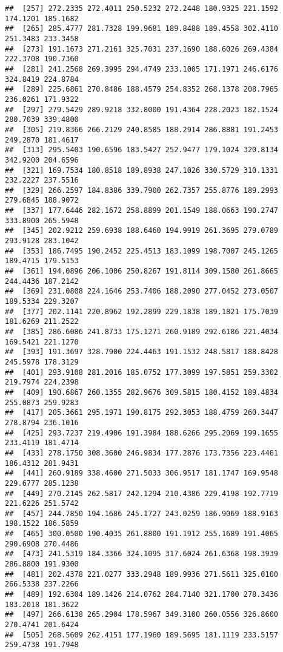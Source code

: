 \documentclass[
]{article}
\begin{document}
\begin{verbatim}
##  [257] 272.2335 272.4011 250.5232 272.2448 180.9325 221.1592 174.1201 185.1682
##  [265] 285.4777 281.7328 199.9681 189.8488 189.4558 302.4110 251.3483 233.3458
##  [273] 191.1673 271.2161 325.7031 237.1690 188.6026 269.4384 222.3708 190.7360
##  [281] 241.2568 269.3995 294.4749 233.1005 171.1971 246.6176 324.8419 224.8784
##  [289] 225.6861 270.8486 188.4579 254.8352 268.1378 208.7965 236.0261 171.9322
##  [297] 279.5429 289.9218 332.8000 191.4364 228.2023 182.1524 280.7039 339.4800
##  [305] 219.8366 266.2129 240.8585 188.2914 286.8881 191.2453 249.2870 181.4617
##  [313] 295.5403 190.6596 183.5427 252.9477 179.1024 320.8134 342.9200 204.6596
##  [321] 169.7534 180.8518 189.8938 247.1026 330.5729 310.1331 232.2227 237.5516
##  [329] 266.2597 184.8386 339.7900 262.7357 255.8776 189.2993 279.6845 188.9072
##  [337] 177.6446 282.1672 258.8899 201.1549 188.0663 190.2747 333.8900 265.5948
##  [345] 202.9212 259.6938 188.6460 194.9919 261.3695 279.0789 293.9128 283.1042
##  [353] 186.7495 190.2452 225.4513 183.1099 198.7007 245.1265 189.4715 179.5153
##  [361] 194.0896 206.1006 250.8267 191.8114 309.1580 261.8665 244.4436 187.2142
##  [369] 231.0808 224.1646 253.7406 188.2090 277.0452 273.0507 189.5334 229.3207
##  [377] 202.1141 220.8962 192.2899 229.1838 189.1821 175.7039 181.6269 211.2522
##  [385] 286.6086 241.8733 175.1271 260.9189 292.6186 221.4034 169.5421 221.1270
##  [393] 191.3697 328.7900 224.4463 191.1532 248.5817 188.8428 245.5978 178.3129
##  [401] 293.9108 281.2016 185.0752 177.3099 197.5851 259.3302 219.7974 224.2398
##  [409] 190.6867 260.1355 282.9676 309.5815 180.4152 189.4834 255.0873 259.9283
##  [417] 205.3661 295.1971 190.8175 292.3053 188.4759 260.3447 278.8794 236.1016
##  [425] 293.7237 219.4906 191.3984 188.6266 295.2069 199.1655 233.4119 181.4714
##  [433] 278.1750 308.3600 246.9834 177.2876 173.7356 223.4461 186.4312 281.9431
##  [441] 260.9189 338.4600 271.5033 306.9517 181.1747 169.9548 229.6777 285.1238
##  [449] 270.2145 262.5817 242.1294 210.4386 229.4198 192.7719 221.6226 251.5742
##  [457] 244.7850 194.1686 245.1727 243.0259 186.9069 188.9163 198.1522 186.5859
##  [465] 300.0500 190.4035 261.8800 191.1912 255.1689 191.4065 290.6908 270.4486
##  [473] 241.5319 184.3366 324.1095 317.6024 261.6368 198.3939 286.8800 191.9300
##  [481] 202.4378 221.0277 333.2948 189.9936 271.5611 325.0100 266.5338 237.2266
##  [489] 192.6304 189.1426 214.0762 284.7140 321.1700 278.3436 183.2018 181.3622
##  [497] 266.6138 265.2904 178.5967 349.3100 260.0556 326.8600 270.4741 201.6424
##  [505] 268.5609 262.4151 177.1960 189.5695 181.1119 233.5157 259.4738 191.7948

\end{verbatim}
\end{document}
